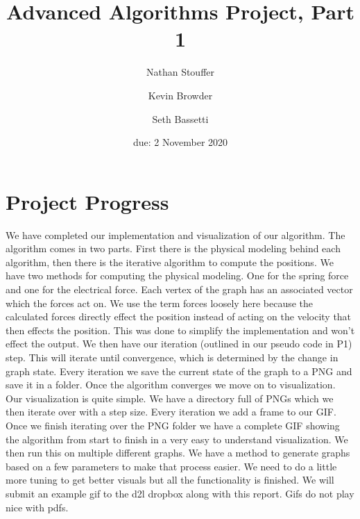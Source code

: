 \documentclass{article}
\title{Advanced Algorithms Project, Part 1}
\author{Nathan Stouffer \and Kevin Browder \and Seth Bassetti}
\date{due: 2 November 2020}
\begin{document}
\maketitle

\section{Project Progress}
We have completed our implementation and visualization of our algorithm. The algorithm comes in two parts. First there is the physical modeling behind each algorithm, then there is the iterative algorithm to compute the positions. We have two methods for computing the physical modeling. One for the spring force and one for the electrical force. Each vertex of the graph has an associated vector which the forces act on. We use the term forces loosely here because the calculated forces directly effect the position instead of acting on the velocity that then effects the position. This was done to simplify the implementation and won't effect the output. We then have our iteration (outlined in our pseudo code in P1) step. This will iterate until convergence, which is determined by the change in graph state. Every iteration we save the current state of the graph to a PNG and save it in a folder. Once the algorithm converges we move on to visualization. \\
Our visualization is quite simple. We have a directory full of PNGs which we then iterate over with a step size. Every iteration we add a frame to our GIF. Once we finish iterating over the PNG folder we have a complete GIF showing the algorithm from start to finish in a very easy to understand visualization. We then run this on multiple different graphs. We have a method to generate graphs based on a few parameters to make that process easier. We need to do a little more tuning to get better visuals but all the functionality is finished. We will submit an example gif to the d2l dropbox along with this report. Gifs do not play nice with pdfs. 
\end{document}
